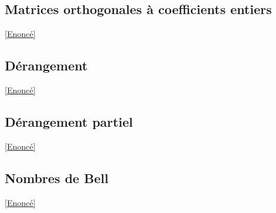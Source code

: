 \documentclass[8pt]{book}
\begin{document}
	\subsection{Matrices orthogonales à coefficients entiers}
	\label{Matrices orthogonales à coefficients entiers corrigé}
	\textcolor{blue}{\hyperref[Matrices orthogonales à coefficients entiers]{[Enoncé]}}\\
	
	\subsection{Dérangement}
	\label{Dérangement corrigé}
	\textcolor{blue}{\hyperref[Dérangement]{[Enoncé]}}\\
	
	\subsection{Dérangement partiel}
	\label{Dérangement partiel corrigé}
	\textcolor{blue}{\hyperref[Dérangement partiel]{[Enoncé]}}\\
	
	\subsection{Nombres de Bell}
	\label{Nombres de Bell corrigé}
	\textcolor{blue}{\hyperref[Nombres de Bell]{[Enoncé]}}\\
	
\end{document}
